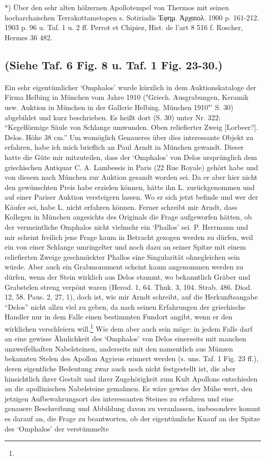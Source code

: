 \documentclass[a4paper, 11pt, oneside]{article}
\begin{document}
*) Über den sehr alten hölzernen Apollotempel von Thermos mit seinen hocharchaischen Terrakottametopen s. Sotiriadis Ἐφημ. Ἀρχαιολ. 1900 p. 161-212. 1903 p. 96 u. Taf. 1 u. 2 ff. Perrot et Chipiez, Hist. de l'art 8 516 f. Roscher, Hermes 36 482.

\subsection{(Siehe Taf. 6 Fig. 8 u. Taf. 1 Fig. 23-30.)}
\paragraph{}
Ein sehr eigentümlicher `Omphalos' wurde kürzlich in dem Auktionskataloge der Firma Helbing in München vom Jahre 1910 ("Griech. Ausgrabungen, Keramik usw. Auktion in München in der Gallerie Helbing. München 1910"' S. 30) abgebildet und kurz beschrieben. Es heißt dort (S. 30) unter Nr. 322: "`Kegelförmige Säule von Schlange umwunden. Oben reliefierter Zweig [Lorbeer?]. Delos. Höhe 38 cm."' Um womöglich Genaueres über dies interessante Objekt zu erfahren, habe ich mich brieflich an Paul Arndt in München gewandt. Dieser hatte die Güte mir mitzuteilen, dass der `Omphalos' von Delos ursprünglich dem griechischen Antiquar C. A. Lambessis in Paris (22 Rue Royale) gehört habe und von diesem nach München zur Auktion gesandt worden sei. Da er aber hier nicht den gewünschten Preis habe erzielen können, hätte ihn L. zurückgenommen und auf einer Pariser Auktion versteigern lassen. Wo er sich jetzt befinde und wer der Käufer sei, habe L. nicht erfahren können. Ferner schreibt mir Arndt, dass Kollegen in München angesichts des Originals die Frage aufgeworfen hätten, ob der vermeintliche Omphalos nicht vielmehr ein `Phallos' sei. P. Herrmann und mir scheint freilich jene Frage kaum in Betracht gezogen werden zu dürfen, weil ein von einer Schlange umringelter und noch dazu an seiner Spitze mit einem reliefierten Zweige geschmückter Phallos eine Singularität ohnegleichen sein würde. Aber auch ein Grabmonument scheint kaum angenommen werden zu dürfen, wenn der Stein wirklich aus Delos stammt, wo bekanntlich Gräber und Grabstelen streng verpönt waren (Herod. 1, 64. Thuk. 3, 104. Strab. 486. Diod. 12, 58. Paus. 2, 27, 1), doch ist, wie mir Arndt schreibt, auf die Herkunftsangabe "`Delos"' nicht allzu viel zu geben, da nach seinen Erfahrungen der griechische Handler nur in dem Falle einen bestimmten Fundort angibt, wenn er den wirklichen verschleiern will.\footnote{} Wie dem aber auch sein möge: in jedem Falle darf an eine gewisse Ähnlichkeit des `Omphalos' von Delos einerseits mit manchen unzweifelhaften Nabelsteinen, anderseits mit den namentlich aus Münzen bekannten Stelen des Apollon Agyieus erinnert werden (s. uns. Taf. 1 Fig. 23 ff.), deren eigentliche Bedeutung zwar auch noch nicht festgestellt ist, die aber hinsichtlich ihrer Gestalt und ihrer Zugehörigkeit zum Kult Apollons entschieden an die apollinischen Nabelsteine gemahnen. Es wäre gewiss der Mühe wert, den jetzigen Aufbewahrungsort des interessanten Steines zu erfahren und eine genauere Beschreibung und Abbildung davon zu veranlassen, insbesondere kommt es darauf an, die Frage zu beantworten, ob der eigentümliche Knauf an der Spitze des `Omphalos' der verstümmelte 
\end{document}
